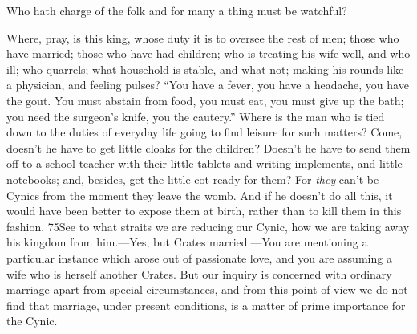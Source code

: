 Who hath charge of the folk and for many a thing must be watchful?

Where, pray, is this king, whose duty it is to oversee the rest of men; those who have married; those who have had children; who is treating his wife well, and who ill; who quarrels; what household is stable, and what not; making his rounds like a physician, and feeling pulses? ``You have a fever, you have a headache, you have the gout. You must abstain from food, you must eat, you must give up the bath; you need the surgeon's knife, you the cautery.'' Where is the man who is tied down to the duties of everyday life going to find leisure for such matters? Come, doesn't he have to get little cloaks for the children? Doesn't he have to send them off to a school-teacher with their little tablets and writing implements, and little notebooks; and, besides, get the little cot ready for them? For \emph{they} can't be Cynics from the moment they leave the womb. And if he doesn't do all this, it would have been better to expose them at birth, rather than to kill them in this fashion. 75See to what straits we are reducing our Cynic, how we are taking away his kingdom from him.—Yes, but Crates married.—You are mentioning a particular instance which arose out of passionate love, and you are assuming a wife who is herself another Crates. But our inquiry is concerned with ordinary marriage apart from special circumstances, and from this point of view we do not find that marriage, under present conditions, is a matter of prime importance for the Cynic.

